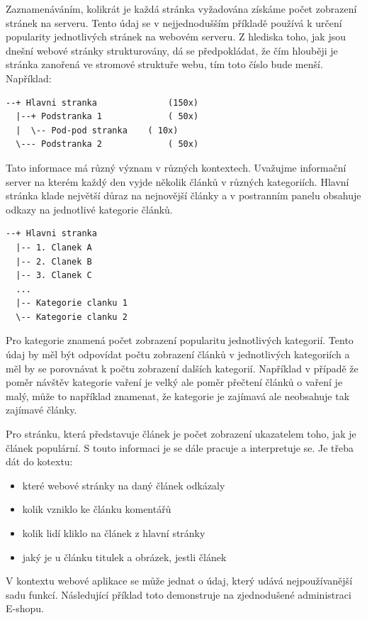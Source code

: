 \documentclass[bc,male,java,dept456]{diploma}						%
\begin{document}
Zaznamenáváním, kolikrát je každá stránka vyžadována získáme počet zobrazení stránek na serveru. Tento údaj se v nejjednodušším příkladě používá k určení popularity jednotlivých stránek na webovém serveru. Z hlediska toho, jak jsou dnešní webové stránky strukturovány, dá se předpokládat, že čím hlouběji je stránka zanořená ve stromové struktuře webu, tím toto číslo bude menší. Například:

\begin{lstlisting}[label=src:Plain,caption=Distribuce návštěv ve stromové struktuře]
--+ Hlavni stranka 				(150x)
  |--+ Podstranka 1				( 50x)
  |  \-- Pod-pod stranka	( 10x)
  \--- Podstranka 2				( 50x)
\end{lstlisting}

Tato informace má různý význam v různých kontextech. Uvažujme informační server na kterém každý den vyjde několik článků v různých kategoriích. Hlavní stránka klade největší důraz na nejnovější články a v postranním panelu obsahuje odkazy na jednotlivé kategorie článků.

\begin{lstlisting}[label=src:Plain,caption=Struktura informačního serveru]
--+ Hlavni stranka
  |-- 1. Clanek A
  |-- 2. Clanek	B	
  |-- 3. Clanek	C
  ...
  |-- Kategorie clanku 1
  \-- Kategorie clanku 2
\end{lstlisting}

Pro kategorie znamená počet zobrazení popularitu jednotlivých kategorií. Tento údaj by měl být odpovídat počtu zobrazení článků v jednotlivých kategoriích a měl by se porovnávat k počtu zobrazení dalších kategorií. Například v případě že poměr návštěv kategorie vaření je velký ale poměr přečtení článků o vaření je malý, může to například znamenat, že kategorie je zajímavá ale neobsahuje tak zajímavé články.

Pro stránku, která představuje článek je počet zobrazení ukazatelem toho, jak je článek populární. S touto informaci je se dále pracuje a interpretuje se. Je třeba dát do kotextu:
\begin{itemize}
  \item{které webové stránky na daný článek odkázaly}
  \item{kolik vzniklo ke článku komentářů}
  \item{kolik lidí kliklo na článek z hlavní stránky}
  \item{jaký je u článku titulek a obrázek, jestli článek}
\end{itemize}


V kontextu webové aplikace se může jednat o údaj, který udává nejpoužívanější sadu funkcí. Následující příklad toto demonstruje na zjednodušené administraci E-shopu.
\end{document}
